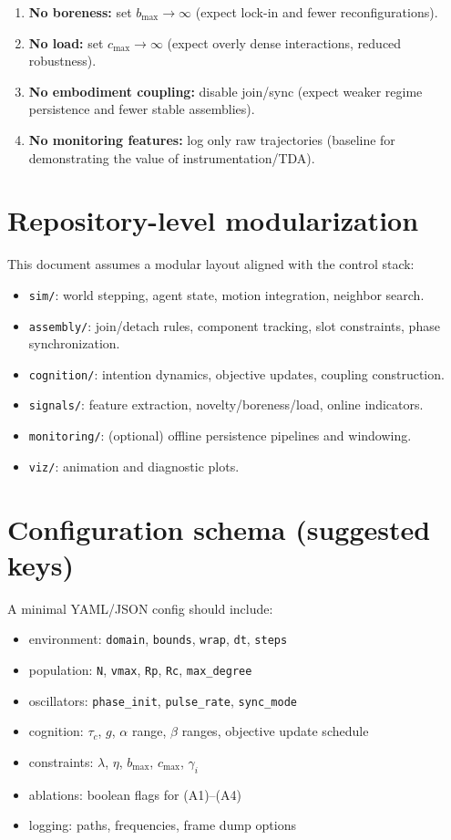 \documentclass[11pt]{article}
\begin{document}
\begin{enumerate}[label=(A\arabic*),leftmargin=2.2em]
\item \textbf{No boreness:} set $b_{\max}\to\infty$ (expect lock-in and fewer reconfigurations).
\item \textbf{No load:} set $c_{\max}\to\infty$ (expect overly dense interactions, reduced robustness).
\item \textbf{No embodiment coupling:} disable join/sync (expect weaker regime persistence and fewer stable assemblies).
\item \textbf{No monitoring features:} log only raw trajectories (baseline for demonstrating the value of instrumentation/TDA).
\end{enumerate}

\section{Repository-level modularization}
This document assumes a modular layout aligned with the control stack:
\begin{itemize}[leftmargin=2.2em]
\item \texttt{sim/}: world stepping, agent state, motion integration, neighbor search.
\item \texttt{assembly/}: join/detach rules, component tracking, slot constraints, phase synchronization.
\item \texttt{cognition/}: intention dynamics, objective updates, coupling construction.
\item \texttt{signals/}: feature extraction, novelty/boreness/load, online indicators.
\item \texttt{monitoring/}: (optional) offline persistence pipelines and windowing.
\item \texttt{viz/}: animation and diagnostic plots.
\end{itemize}

\section{Configuration schema (suggested keys)}
A minimal YAML/JSON config should include:
\begin{itemize}[leftmargin=2.2em]
\item environment: \texttt{domain}, \texttt{bounds}, \texttt{wrap}, \texttt{dt}, \texttt{steps}
\item population: \texttt{N}, \texttt{vmax}, \texttt{Rp}, \texttt{Rc}, \texttt{max\_degree}
\item oscillators: \texttt{phase\_init}, \texttt{pulse\_rate}, \texttt{sync\_mode}
\item cognition: $\tau_c$, $g$, $\alpha$ range, $\beta$ ranges, objective update schedule
\item constraints: $\lambda$, $\eta$, $b_{\max}$, $c_{\max}$, $\gamma_i$
\item ablations: boolean flags for (A1)--(A4)
\item logging: paths, frequencies, frame dump options
\end{itemize}
\end{document}
